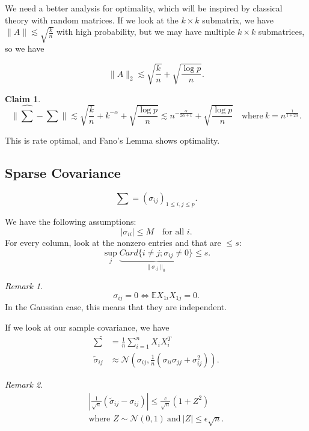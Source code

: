 \documentclass[twoside]{article}
\theoremstyle{definition}
\theoremstyle{definition}
\newtheorem*{claim}{Claim}
\theoremstyle{remark}
\newtheorem*{rem}{Remark}
\begin{document}
We need a better analysis for optimality, which will be inspired by classical theory with random matrices. If we look at the $k \times k$ submatrix, we have $\| A \| \lesssim \sqrt{\frac{k}{n}}$ with high probability, but we may have multiple $k \times k$ submatrices, so we have

\[
\| A \|_2 \lesssim \sqrt{\frac{k}{n}} + \sqrt{\frac{\log p}{n}}.
\]

\begin{claim}
\[
\| \widehat\sum - \sum \| \lesssim \sqrt{\frac{k}{n}} + k^{-\alpha} + \sqrt{\frac{\log p}{n}} \lesssim n^{-\frac{\alpha}{2\alpha + 1}} + \sqrt{\frac{\log p}{n}} \quad \text{where} \ k=n^{\frac{1}{1+2\alpha}}.
\]
\end{claim}

This is rate optimal, and Fano's Lemma shows optimality.

\subsection{Sparse Covariance}

\[
\sum = (\sigma_{ij})_{1 \leq i, j \leq p}.
\]

We have the following assumptions:
\[
| \sigma_{ii} | \leq M \quad \text{for all } i.
\]
For every column, look at the nonzero entries and that are $\leq s$:
\[
\sup \limits_j \underbrace{Card\{ i \ne j; \sigma_{ij} \ne 0 \}}_{\| \sigma_{.j} \|_0 } \leq s.
\]

\begin{rem}
\[
\sigma_{ij} = 0 \Leftrightarrow \mathbb{E} X_{1i} X_{1j} = 0.
\]
In the Gaussian case, this means that they are independent.
\end{rem}

If we look at our sample covariance, we have
\[
\begin{aligned}
\widetilde \sum &= \frac{1}{n} \sum \limits_{i=1}^n X_i X_i^T \\
\widetilde \sigma_{ij} &\approx \mathcal{N} (\sigma_{ij}, \frac{1}{n} (\sigma_{ii}\sigma_{jj} + \sigma_{ij}^2)).
\end{aligned}
\]

\begin{rem}
\[
\begin{aligned}
| \frac{1}{\sqrt{n}} (\widetilde \sigma_{ij} - \sigma_{ij}) |\leq \frac{c}{\sqrt{n}} (1 + Z^2) \\
\text{where } Z \sim \mathcal{N} (0, 1) \ \text{and} \ |Z| \leq \epsilon \sqrt{n}.
\end{aligned}
\]
\end{rem}
\end{document}
